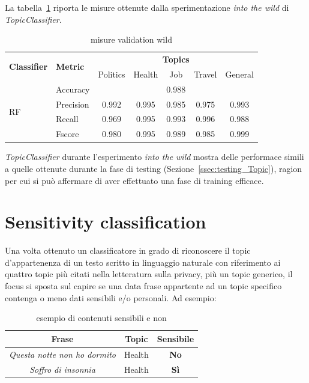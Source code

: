 La tabella~\ref{tbl:testing_wild} riporta le misure ottenute dalla sperimentazione \textit{into the wild} di \textit{TopicClassifier}. 
\begin{table}[h]
\begin{tabular}{|l|l|c|c|c|c|c|}
\hline
\multirow{2}{*}{\textbf{Classifier}} & \multirow{2}{*}{\textbf{Metric}} & \multicolumn{5}{c|}{\textbf{Topics}} \\ \cline{3-7} 
 &  & Politics & Health & Job & Travel & General \\ \hline
\multirow{4}{*}{RF} & Accuracy & \multicolumn{5}{c|}{0.988} \\ \cline{2-7} 
 & Precision & 0.992 & 0.995 & 0.985 & 0.975 & 0.993 \\ \cline{2-7} 
 & Recall & 0.969 & 0.995 & 0.993 & 0.996 & 0.988 \\ \cline{2-7} 
 & Fscore & 0.980 & 0.995 & 0.989 & 0.985 & 0.999 \\ \hline
\end{tabular}
\caption{misure validation wild}
\label{tbl:testing_wild}
\end{table}
\FloatBarrier
\textit{TopicClassifier} durante l'esperimento \textit{into the wild} mostra delle performace simili a quelle ottenute durante la fase di testing (Sezione~\ref{ssec:testing_Topic}), ragion per cui si può affermare di aver effettuato una fase di training efficace.

\section{Sensitivity classification}
\label{sec:sensclass}
Una volta ottenuto un classificatore in grado di riconoscere il topic d'appartenenza di un testo scritto in linguaggio naturale con riferimento ai quattro topic più citati nella letteratura sulla privacy, più un topic generico, il focus si sposta sul capire se una data frase appartente ad un topic specifico contenga o meno dati sensibili e/o personali. Ad esempio:
\begin{table}[h]
\label{tbl:example_sens}
\centering
\begin{tabular}{|c|c|c|}
\hline
\textbf{Frase} & \textbf{Topic} & \textbf{Sensibile} \\ \hline
\textit{Questa notte non ho dormito} & Health & \textbf{No} \\ \hline
\textit{Soffro di insonnia} & Health & \textbf{Sì} \\ \hline
\end{tabular}
\caption{esempio di contenuti sensibili e non}
\end{table}
\FloatBarrier

